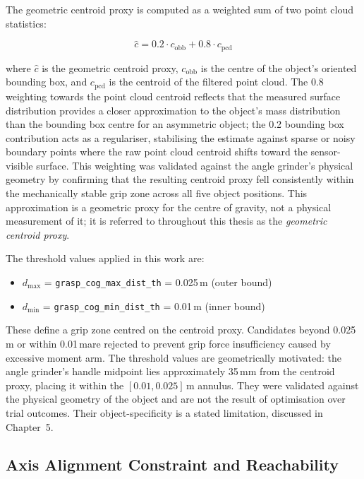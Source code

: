 \documentclass[12pt, a4paper]{report}
\newcommand{\param}[1]{\texttt{#1}}
\begin{document}
The geometric centroid proxy is computed as a weighted sum of two point cloud statistics:

\begin{equation}\label{eq:cog}
  \hat{c} = 0.2 \cdot c_{\mathrm{obb}} + 0.8 \cdot c_{\mathrm{pcd}}
\end{equation}

where $\hat{c}$ is the geometric centroid proxy, $c_{\mathrm{obb}}$ is the centre of the object's oriented bounding box, and $c_{\mathrm{pcd}}$ is the centroid of the filtered point cloud. The 0.8 weighting towards the point cloud centroid reflects that the measured surface distribution provides a closer approximation to the object's mass distribution than the bounding box centre for an asymmetric object; the 0.2 bounding box contribution acts as a regulariser, stabilising the estimate against sparse or noisy boundary points where the raw point cloud centroid shifts toward the sensor-visible surface. This weighting was validated against the angle grinder's physical geometry by confirming that the resulting centroid proxy fell consistently within the mechanically stable grip zone across all five object positions. This approximation is a geometric proxy for the centre of gravity, not a physical measurement of it; it is referred to throughout this thesis as the \textit{geometric centroid proxy}.

The threshold values applied in this work are:
\begin{itemize}
  \item $d_{\max}$ = \param{grasp\_cog\_max\_dist\_th} = 0.025\,m (outer bound)
  \item $d_{\min}$ = \param{grasp\_cog\_min\_dist\_th} = 0.01\,m (inner bound)
\end{itemize}

These define a grip zone centred on the centroid proxy. Candidates beyond 0.025\,m or within 0.01\,mare rejected to prevent grip force insufficiency caused by excessive moment arm. The threshold values are geometrically motivated: the angle grinder's handle midpoint lies approximately 35\,mm from the centroid proxy, placing it within the $[0.01, 0.025]$\,m annulus. They were validated against the physical geometry of the object and are not the result of optimisation over trial outcomes. Their object-specificity is a stated limitation, discussed in Chapter~5.

\subsection{Axis Alignment Constraint and Reachability}
\label{sec:axis-alignment-constraint}
\end{document}
